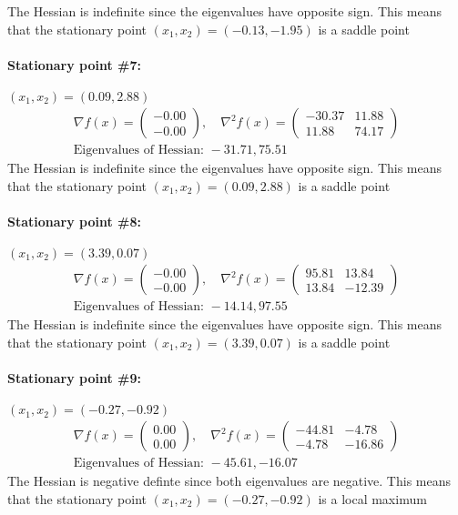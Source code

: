 The Hessian is indefinite since the eigenvalues have opposite sign. This means that the stationary point $(x_1,x_2) = (-0.13,-1.95)$ is a saddle point\paragraph{Stationary point \#7:} $(x_1,x_2) = (0.09,2.88)$
\begin{gather*}
\nabla f(x) = \begin{pmatrix} -0.00 \\ -0.00 \end{pmatrix}, \quad 
\nabla^2 f(x) = \begin{pmatrix} -30.37 & 11.88 \\ 11.88 & 74.17 \end{pmatrix} \\ 
\text{Eigenvalues of Hessian: } -31.71, 75.51\end{gather*}
The Hessian is indefinite since the eigenvalues have opposite sign. This means that the stationary point $(x_1,x_2) = (0.09,2.88)$ is a saddle point\paragraph{Stationary point \#8:} $(x_1,x_2) = (3.39,0.07)$
\begin{gather*}
\nabla f(x) = \begin{pmatrix} -0.00 \\ -0.00 \end{pmatrix}, \quad 
\nabla^2 f(x) = \begin{pmatrix} 95.81 & 13.84 \\ 13.84 & -12.39 \end{pmatrix} \\ 
\text{Eigenvalues of Hessian: } -14.14, 97.55\end{gather*}
The Hessian is indefinite since the eigenvalues have opposite sign. This means that the stationary point $(x_1,x_2) = (3.39,0.07)$ is a saddle point\paragraph{Stationary point \#9:} $(x_1,x_2) = (-0.27,-0.92)$
\begin{gather*}
\nabla f(x) = \begin{pmatrix} 0.00 \\ 0.00 \end{pmatrix}, \quad 
\nabla^2 f(x) = \begin{pmatrix} -44.81 & -4.78 \\ -4.78 & -16.86 \end{pmatrix} \\ 
\text{Eigenvalues of Hessian: } -45.61, -16.07\end{gather*}
The Hessian is negative definte since both eigenvalues are negative. This means that the stationary point $(x_1,x_2) = (-0.27,-0.92)$ is a local maximum